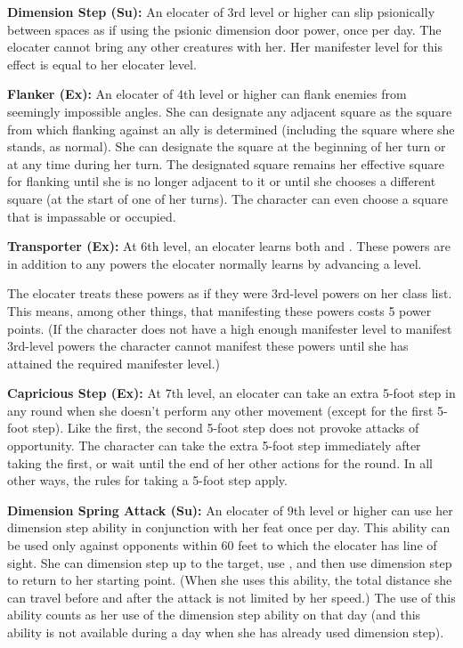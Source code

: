 {\textbf{Dimension Step (Su):} An elocater of 3rd level or higher can slip psionically between spaces as if using the psionic dimension door power, once per day. The elocater cannot bring any other creatures with her. Her manifester level for this effect is equal to her elocater level.

\textbf{Flanker (Ex):} An elocater of 4th level or higher can flank enemies from seemingly impossible angles. She can designate any adjacent square as the square from which flanking against an ally is determined (including the square where she stands, as normal). She can designate the square at the beginning of her turn or at any time during her turn. The designated square remains her effective square for flanking until she is no longer adjacent to it or until she chooses a different square (at the start of one of her turns). The character can even choose a square that is impassable or occupied.

\textbf{Transporter (Ex):} At 6th level, an elocater learns both  and . These powers are in addition to any powers the elocater normally learns by advancing a level.

The elocater treats these powers as if they were 3rd-level powers on her class list. This means, among other things, that manifesting these powers costs 5 power points. (If the character does not have a high enough manifester level to manifest 3rd-level powers the character cannot manifest these powers until she has attained the required manifester level.)

\textbf{Capricious Step (Ex):} At 7th level, an elocater can take an extra 5-foot step in any round when she doesn't perform any other movement (except for the first 5-foot step). Like the first, the second 5-foot step does not provoke attacks of opportunity. The character can take the extra 5-foot step immediately after taking the first, or wait until the end of her other actions for the round. In all other ways, the rules for taking a 5-foot step apply.

\textbf{Dimension Spring Attack (Su):} An elocater of 9th level or higher can use her dimension step ability in conjunction with her  feat once per day. This ability can be used only against opponents within 60 feet to which the elocater has line of sight. She can dimension step up to the target, use , and then use dimension step to return to her starting point. (When she uses this ability, the total distance she can travel before and after the attack is not limited by her speed.) The use of this ability counts as her use of the dimension step ability on that day (and this ability is not available during a day when she has already used dimension step).

}
